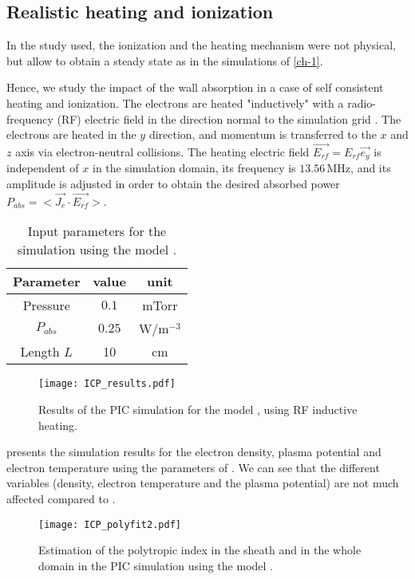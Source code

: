 \subsection{Realistic heating and ionization}
In the study used, the ionization and the heating mechanism were not physical, but allow to obtain a steady state as in the simulations of \cref{ch-1}.

Hence, we study the impact of the wall absorption in a case of self consistent heating and ionization.
The electrons are heated "inductively" with a radio-frequency (RF) electric field in the direction normal to the simulation grid \cite{meige2006a, lucken2018, turner93}.
The electrons are heated in the $y$ direction, and momentum is transferred to the $x$ and $z$ axis via electron-neutral collisions.
The heating electric field $\vec{E_{rf}} = E_{rf} \vec{e_y}$ is independent of $x$ in the simulation domain, its frequency is $13.56$\,MHz, and its amplitude is adjusted in order to obtain the desired absorbed power $P_{abs} = < \vec{J_e} \cdot  \vec{E_{rf}}>$.


\begin{table}[!htbp]
  \centering
  \begin{tabular}{c | c | c}
    Parameter & value & unit \\ \hline
    Pressure & $0.1$ & mTorr\\
    $P_{abs}$ & $0.25$ & W/m$^{-3}$\\
    Length $L$&10&cm\\
  \end{tabular}
  \caption{Input parameters for the simulation using the model .}
  \label{tab-PIC2}
\end{table}

\begin{figure}[!htbp]
  \center
  \texttt{[image: ICP\_results.pdf]}
  \caption{Results of the PIC simulation for the model , using RF inductive heating.}
  \label{fig-icpresults}
\end{figure}

 presents the simulation results for the electron density, plasma potential and electron temperature using the parameters of .
We can see that the different variables (density, electron temperature and the plasma potential) are not much affected compared to .

\begin{figure}[!htbp]
  \centering
  \texttt{[image: ICP\_polyfit2.pdf]}
  \caption{Estimation of the polytropic index in the sheath and in the whole domain in the PIC simulation using the model .}
  \label{fig-icpfit}
\end{figure}


